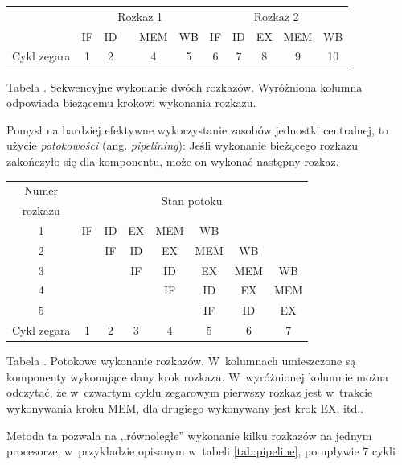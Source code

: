 \documentclass[12pt,makeidx]{mwart}
\newcounter{tabmain}
\newcommand{\mytabcaption}[1]{ \begin{center}Tabela \arabic{tabmain}. #1.\end{center} \addtocounter{tabmain}{1} }
\begin{document}
	\begin{center}
	\centering
	\begin{tabular}{|c|c|c|c|c|c|c|c|c|c|c|} \hline
	& \multicolumn{5}{c|}{Rozkaz 1} & \multicolumn{5}{c|}{Rozkaz 2}  \\
	\hhline{|~|*{10}-}& IF & ID & {\cellcolor{yellow}{EX}} & MEM & WB & IF & ID & EX & MEM & WB\\ \hline \hline
	Cykl zegara & 1 & 2 & {\cellcolor{yellow}{3}} & 4 & 5 & 6 & 7 & 8 & 9 & 10 \\ \hline
	\end{tabular}\par
	\mytabcaption{Sekwencyjne wykonanie dwóch rozkazów. Wyróżniona kolumna odpowiada bieżącemu krokowi wykonania
	rozkazu}
	\end{center}\par
\par
%
\indent 
	Pomysł na bardziej efektywne wykorzystanie zasobów jednostki centralnej, to użycie \emph{potokowości} (ang. \emph{pipelining}):
	Jeśli wykonanie bieżącego rozkazu zakończyło się dla komponentu, może on wykonać następny rozkaz.
	\begin{center}
	\centering
	\begin{tabular}{|c|c|c|c|c|c|c|c|} \hline
	Numer 		 & \multicolumn{7}{c|}{\multirow{2}{*}{Stan potoku}} \\
	rozkazu & \multicolumn{7}{c|}{} \\ \hline
	1 & IF & ID & EX & \cellcolor{yellow} MEM & WB & & \\ \hline
	2 & & IF & ID & \cellcolor{yellow} EX & MEM & WB & \\ \hline
	3 & & & IF & \cellcolor{yellow} ID & EX & MEM & WB \\ \hline
	4 & & & & \cellcolor{yellow} IF & ID & EX & MEM \\ \hline
	5 & & & & \cellcolor{yellow} & IF & ID & EX \\ \hline \hline
	Cykl zegara & 1 & 2 & 3 & \cellcolor{yellow} 4 & 5 & 6 & 7 \\ \hline
	\end{tabular}
	\mytabcaption{Potokowe wykonanie rozkazów. W~kolumnach umieszczone są komponenty wykonujące dany krok rozkazu.
	W~wyróżnionej kolumnie można odczytać, że w~czwartym cyklu zegarowym pierwszy rozkaz jest w~trakcie wykonywania kroku MEM, 
	dla drugiego wykonywany jest krok EX, itd.}
	\label{tab:pipeline}
	\end{center}
	Metoda ta pozwala na ,,równoległe'' wykonanie kilku rozkazów na jednym procesorze, w~przykładzie opisanym w~tabeli \ref{tab:pipeline}, po upływie 7 cykli
\end{document}
